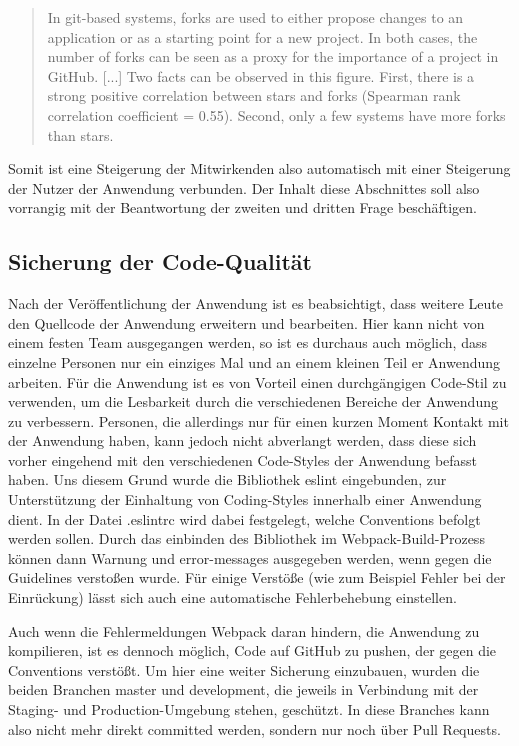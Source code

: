 \begin{quote}
  In git-based systems, forks are used to either propose changes to an application or as
a starting point for a new project. In both cases, the number of forks can be seen as a proxy
for the importance of a project in GitHub. [...] Two facts can be observed in this figure. First, there is a strong positive
correlation between stars and forks (Spearman rank correlation coefficient = 0.55). Second,
only a few systems have more forks than stars.
\end{quote}

Somit ist eine Steigerung der Mitwirkenden also automatisch mit einer Steigerung der Nutzer der Anwendung verbunden. Der Inhalt diese Abschnittes soll also vorrangig mit der Beantwortung der zweiten und dritten Frage beschäftigen.

\subsection{Sicherung der Code-Qualität}
Nach der Veröffentlichung der Anwendung ist es beabsichtigt, dass weitere Leute den Quellcode der Anwendung erweitern und bearbeiten. Hier kann nicht von einem festen Team ausgegangen werden, so ist es durchaus auch möglich, dass einzelne Personen nur ein einziges Mal und an einem kleinen Teil er Anwendung arbeiten. Für die Anwendung ist es von Vorteil einen durchgängigen Code-Stil zu verwenden, um die Lesbarkeit durch die verschiedenen Bereiche der Anwendung zu verbessern. Personen, die allerdings nur für einen kurzen Moment Kontakt mit der Anwendung haben, kann  jedoch nicht abverlangt werden, dass diese sich vorher eingehend mit den verschiedenen Code-Styles der Anwendung befasst haben. Uns diesem Grund wurde die Bibliothek eslint eingebunden, zur Unterstützung der Einhaltung von Coding-Styles innerhalb einer Anwendung dient.
In der Datei .eslintrc wird dabei festgelegt, welche Conventions befolgt werden sollen. Durch das einbinden des Bibliothek im Webpack-Build-Prozess können dann Warnung und error-messages ausgegeben werden, wenn gegen die Guidelines verstoßen wurde. Für einige Verstöße (wie zum Beispiel Fehler bei der Einrückung) lässt sich auch eine automatische  Fehlerbehebung einstellen.

Auch wenn die Fehlermeldungen Webpack daran hindern, die Anwendung zu kompilieren, ist es dennoch möglich, Code auf GitHub zu pushen, der gegen die Conventions verstößt. Um hier eine weiter Sicherung einzubauen, wurden die beiden Branchen master und development, die jeweils in Verbindung mit der Staging- und Production-Umgebung stehen, geschützt. In diese Branches kann also nicht mehr direkt committed werden, sondern nur noch über Pull Requests.

